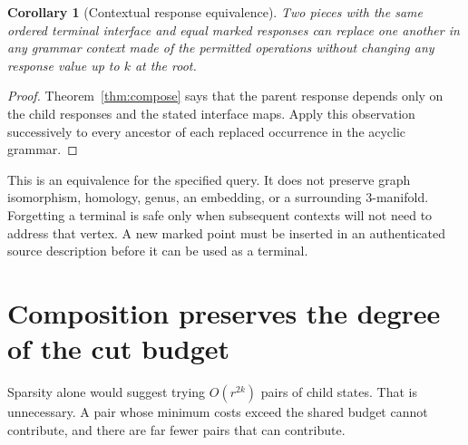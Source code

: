\documentclass[11pt,a4paper]{article}
\newtheorem{corollary}[theorem]{Corollary}
\theoremstyle{definition}
\theoremstyle{remark}
\begin{document}
\begin{corollary}[Contextual response equivalence]
\label{cor:context}
Two pieces with the same ordered terminal interface and equal marked responses can replace one another in any grammar context made of the permitted operations without changing any response value up to $k$ at the root.
\end{corollary}
\begin{proof}
Theorem~\ref{thm:compose} says that the parent response depends only on the child responses and the stated interface maps. Apply this observation successively to every ancestor of each replaced occurrence in the acyclic grammar.
\end{proof}
This is an equivalence for the specified query. It does not preserve graph isomorphism, homology, genus, an embedding, or a surrounding 3-manifold. Forgetting a terminal is safe only when subsequent contexts will not need to address that vertex. A new marked point must be inserted in an authenticated source description before it can be used as a terminal.

\section{Composition preserves the degree of the cut budget}
\label{sec:budget}
Sparsity alone would suggest trying $O(r^{2k})$ pairs of child states. That is unnecessary. A pair whose minimum costs exceed the shared budget cannot contribute, and there are far fewer pairs that can contribute.
\end{document}
